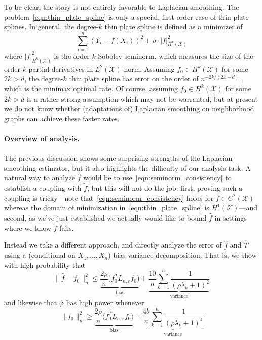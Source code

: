 \documentclass[twoside]{article}
\newcommand{\1}{\mathbf{1}}
\newcommand{\Lap}{L}
\newcommand{\Xset}{\mathcal{X}}
\newcommand{\wt}[1]{\widetilde{#1}}
\newcommand{\wh}[1]{\widehat{#1}}
\theoremstyle{definition}
\theoremstyle{remark}
\begin{document}
To be clear, the story is not entirely favorable to Laplacian smoothing. The problem~\eqref{eqn:thin_plate_spline} is only a special, first-order case of thin-plate splines. In general, the degree-$k$ thin plate spline is defined as a minimizer of
\begin{equation*}
\sum_{i = 1}^{n} (Y_i - f(X_i))^2 + \rho \cdot |f|_{H^k(\Xset)}^2
\end{equation*}
where $|f|_{H^k(\Xset)}^2$ is the order-$k$ Sobolev seminorm, which measures the size of the order-$k$ partial derivatives in $L^2(\Xset)$ norm. Assuming $f_0 \in H^k(\Xset)$ for some $2k > d$, the degree-$k$ thin plate spline has error on the order of $n^{-2k/(2k + d)}$ \cite{vandergeer2000}, which is the minimax optimal rate. Of course, assuming $f_0 \in H^k(\Xset)$ for some $2k > d$ is a rather strong assumption which may not be warranted, but at present we do not know whether (adaptations of) Laplacian smoothing on neighborhood graphs can achieve these faster rates.

\paragraph{Overview of analysis.}
The previous discussion shows some surprising strengths of the Laplacian smoothing estimator, but it also highlights the difficulty of our analysis task. A natural way to analyze $\wh{f}$ would be to use~\eqref{eqn:seminorm_consistency} to establish a coupling with $\wt{f}$, but this will not do the job: first, proving such a coupling is tricky---note that~\eqref{eqn:seminorm_consistency} holds for $f \in C^2(\Xset)$ whereas the domain of minimization in~\eqref{eqn:thin_plate_spline} is $H^1(\Xset)$---and second, as we've just established we actually would like to bound $\wh{f}$ in settings where we know $\wt{f}$ fails.

Instead we take a different approach, and directly analyze the error of $\wh{f}$ and $\wh{T}$ using a (conditional on $X_1,\ldots,X_n$) bias-variance decomposition. That is, we show with high probability that
\begin{equation*}
\bigl\|\wh{f} - f_0\bigr\|_n^2 \leq \underbrace{\frac{2\rho}{n} \bigl(f_0^T \Lap_{n,r} f_0\bigr)}_{\textrm{bias}} + \underbrace{\frac{10}{n} \sum_{k = 1}^{n} \frac{1}{(\rho \lambda_k + 1)^2}}_{\textrm{variance}}
\end{equation*}
and likewise that $\wh{\varphi}$ has high power whenever
\begin{equation*}
\bigl\|f_0\bigr\|_n^2 \geq \underbrace{\frac{2\rho}{n} \bigl(f_0^T \Lap_{n,r} f_0\bigr)}_{\textrm{bias}} + \underbrace{\frac{4b}{n} \sum_{k = 1}^{n} \frac{1}{(\rho \lambda_k + 1)^4}}_{\textrm{variance}}
\end{equation*}
\end{document}
